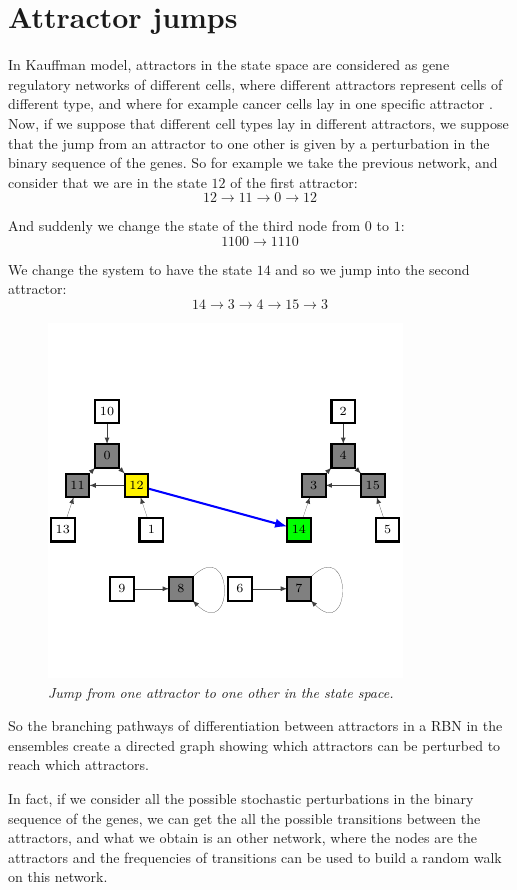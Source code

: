 \section{Attractor jumps}
In Kauffman model, attractors in the state space are considered as gene regulatory networks of different cells, where different attractors represent cells of different type, and where for example cancer cells lay in one specific attractor \cite{K3}\cite{K2}.
Now, if we suppose that different cell types lay in different attractors, we  suppose that the jump from an attractor to one other is given by a perturbation in the binary sequence of the genes.
So for example we take the previous network, and consider that we are in the state $12$ of the first attractor:
$$
12 \to 11 \to 0 \to 12
$$

And suddenly we change the state of the third node from $0$ to $1$:
$$
1100 \to 1110
$$

We change the system to have the state $14$ and so we jump into the second attractor:
$$
14 \to 3 \to 4 \to 15 \to 3
$$
\begin{figure}[h]
\centering
\includegraphics[scale=1.4]{fg4.pdf}
\caption{\emph{Jump from one attractor to one other in the state space.}}
\label{fig:rb4}
\end{figure}

So the branching pathways of differentiation between
attractors in a RBN in the ensembles create a directed
graph showing which attractors can be perturbed to reach which attractors.

In fact, if we consider all the possible stochastic perturbations in the binary sequence of the genes, we can get the all the possible transitions between the attractors, and what we obtain is an other network, where the nodes are the attractors and the frequencies of transitions can be used to build a random walk on this network\cite{K2}\cite{K3}\cite{K29}.


